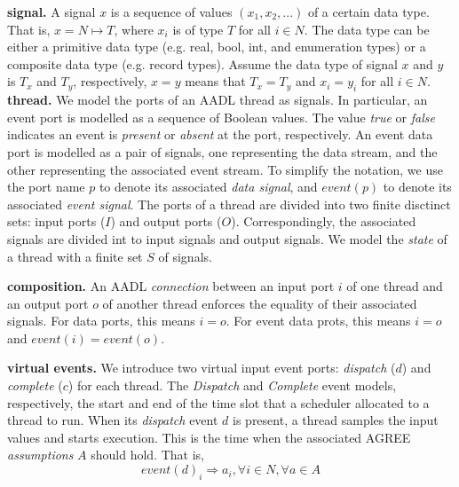 {\bf signal.}
A signal $x$ is a sequence of values $(x_1, x_2, ...)$ of a certain data type. That is, $x = N \mapsto T$, where $x_i$ is of type $T$ for all $i \in N$. The data type can be either a primitive data type (e.g. real, bool, int, and enumeration types) or a composite data type (e.g. record types). Assume the data type of signal $x$ and $y$ is $T_x$ and $T_y$, respectively, $x = y$ means that $T_x=T_y$ and $x_i = y_i$ for all $i \in N$. 
{\bf thread.}
We model the ports of an AADL thread as signals. In particular, an event port is modelled as a sequence of Boolean values. The value \emph{true} or \emph{false} indicates an event is \emph{present} or \emph{absent} at the port, respectively. An event data port is modelled as a pair of signals, one representing the data stream, and the other representing the associated event stream. To simplify the notation, we use the port name $p$ to denote its associated \emph{data signal}, and $event(p)$ to denote its associated \emph{event signal}. The ports of a thread are divided into two finite disctinct sets: input ports ($I$) and output ports ($O$). Correspondingly, the associated signals are divided int to input signals and output signals. We model the \emph{state} of a thread with a finite set $S$ of signals. %

{\bf composition.}
An AADL \emph{connection} between an input port $i$ of one thread and an output port $o$ of another thread enforces the equality of their associated signals. For data ports, this means $i = o$. For event data prots, this means $i = o$ and $event(i) = event(o)$. %

{\bf virtual events.}
We introduce two virtual input event ports: \emph{dispatch} ($d$) and \emph{complete} ($c$) for each thread.  The \emph{Dispatch} and \emph{Complete} event models, respectively, the start and end of the time slot that a scheduler allocated to a thread to run. 
When its \emph{dispatch} event $d$ is present, a thread samples the input values and starts execution. This is the time when the associated AGREE \emph{assumptions} $A$ should hold. That is,
$$event(d)_i \Rightarrow a_i, \forall i\in N, \forall a \in A $$

